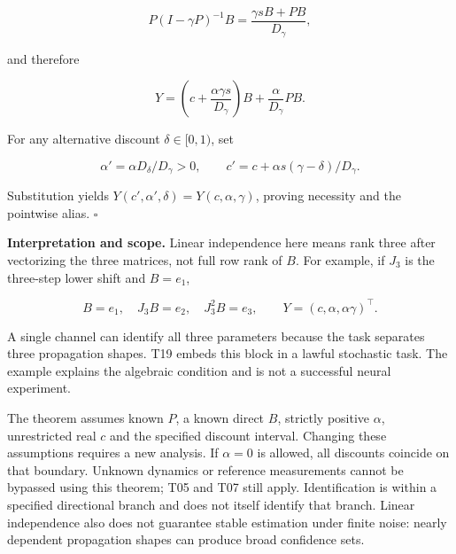 \documentclass[11pt,a4paper]{article}
\begin{document}
\[
P(I-\gamma P)^{-1}B=\frac{\gamma sB+PB}{D_\gamma},
\]

\par
\noindent\begin{minipage}{\linewidth}

and therefore

\[
Y=\left(c+\frac{\alpha\gamma s}{D_\gamma}\right)B
+\frac{\alpha}{D_\gamma}PB.
\]

\end{minipage}\par

\par
\noindent\begin{minipage}{\linewidth}

For any alternative discount \(\delta\in[0,1)\), set

\[
\alpha'=\alpha D_\delta/D_\gamma>0,\qquad
c'=c+\alpha s(\gamma-\delta)/D_\gamma.
\]

\end{minipage}\par

Substitution yields \(Y(c',\alpha',\delta)=Y(c,\alpha,\gamma)\), proving
necessity and the pointwise alias. \(\square\)

\par
\noindent\begin{minipage}{\linewidth}

\textbf{Interpretation and scope.} Linear independence here means rank
three after vectorizing the three matrices, not full row rank of \(B\).
For example, if \(J_3\) is the three-step lower shift and \(B=e_1\),

\[
B=e_1,\quad J_3B=e_2,\quad J_3^2B=e_3,\qquad
Y=(c,\alpha,\alpha\gamma)^\top.
\]

\end{minipage}\par

A single channel can identify all three parameters because the task
separates three propagation shapes. T19 embeds this block in a lawful
stochastic task. The example explains the algebraic condition and is not
a successful neural experiment.

The theorem assumes known \(P\), a known direct \(B\), strictly positive
\(\alpha\), unrestricted real \(c\) and the specified discount interval.
Changing these assumptions requires a new analysis. If \(\alpha=0\) is
allowed, all discounts coincide on that boundary. Unknown dynamics or
reference measurements cannot be bypassed using this theorem; T05 and
T07 still apply. Identification is within a specified directional branch
and does not itself identify that branch. Linear independence also does
not guarantee stable estimation under finite noise: nearly dependent
propagation shapes can produce broad confidence sets.
\end{document}
